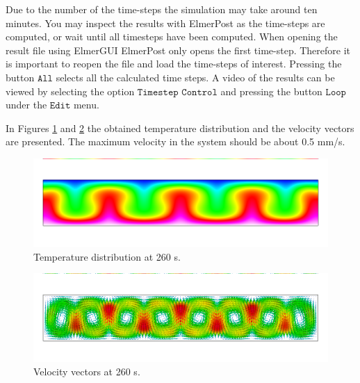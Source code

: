 Due to the number of the time-steps the simulation may take around ten minutes.
You may inspect the results with ElmerPost as the time-steps are computed, or
wait until all timesteps have been computed. 
When opening the result file using ElmerGUI ElmerPost only opens the first time-step.
Therefore it is important to reopen the file and load the time-steps of interest.
Pressing the button $\texttt{All}$ selects all the calculated time steps.
A video of the results can be viewed by selecting the option $\texttt{Timestep}$ 
$\texttt{Control}$ and pressing the button $\texttt{Loop}$ under the $\texttt{Edit}$ menu.

In Figures \ref{fg:rb_temp} and \ref{fg:rb_vel} the obtained temperature 
distribution and the velocity vectors are presented. 
The maximum velocity in the system should be about 0.5 mm/s. 

\begin{figure}[h]
\centering
\includegraphics[width=15cm, viewport=0 50 1000 250,clip]{rb_temp}
\caption{Temperature distribution at 260 s.}\label{fg:rb_temp}
\end{figure} 

\begin{figure}[h]
\centering
\includegraphics[width=15cm, viewport=0 50 1000 250,clip]{rb_velo}
\caption{Velocity vectors at 260 s.}\label{fg:rb_vel}
\end{figure} 





